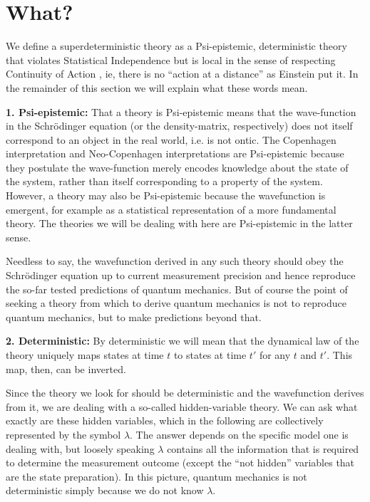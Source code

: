 \documentclass[12pt]{article}
\begin{document}
\section{What?}
\label{what}

We define a superdeterministic theory as a Psi-epistemic, deterministic theory that violates Statistical Independence but is local in the sense of respecting Continuity of Action \cite{Wharton}, ie, there is no ``action at a distance'' as Einstein put it. In the remainder of this section we will explain what these words mean.

{\bf 1. Psi-epistemic:} That a theory is Psi-epistemic means that the wave-function in the Schr\"odinger equation (or the density-matrix, respectively) does not itself correspond to an object in the real world, i.e. is not ontic. The Copenhagen interpretation and Neo-Copenhagen interpretations are Psi-epistemic because they postulate the wave-function merely encodes knowledge about the state of the system, rather than itself corresponding to a property of the system. However, a theory may also be Psi-epistemic because the wavefunction is emergent, for example as a statistical representation of a more fundamental theory. The theories we will be dealing with here are Psi-epistemic in the latter sense. 

Needless to say, the wavefunction derived in any such theory should obey the Schr\"odinger equation up to current measurement precision and hence reproduce the so-far tested predictions of quantum mechanics. But of course the point of seeking a theory from which to derive quantum mechanics is not to reproduce quantum mechanics, but to make predictions beyond that.

{\bf 2. Deterministic:} By deterministic we will mean that the dynamical law of the theory uniquely maps states at time $t$ to states at time $t'$ for any $t$ and $t'$. This map, then, can be inverted. 

Since the theory we look for should be deterministic and the wavefunction derives from it, we are dealing with a so-called hidden-variable theory. We can ask what exactly are these hidden variables, which in the following are collectively represented by the symbol $\lambda$. The answer depends on the specific model one is dealing with, but loosely speaking $\lambda$ contains all the information that is required to determine the measurement outcome (except the ``not hidden'' variables that are the state preparation). In this picture, quantum mechanics is not deterministic simply because we do not know $\lambda$.
\end{document}
